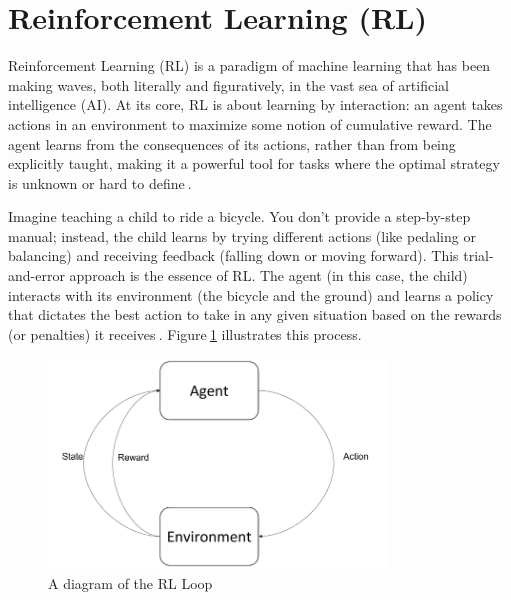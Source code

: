 \section{Reinforcement Learning (RL)}\label{RL_background}

Reinforcement Learning (RL) is a paradigm of machine learning that has been making waves, both literally and figuratively, in the vast sea of artificial intelligence (AI). At its core, RL is about learning by interaction: an agent takes actions in an environment to maximize some notion of cumulative reward. The agent learns from the consequences of its actions, rather than from being explicitly taught, making it a powerful tool for tasks where the optimal strategy is unknown or hard to define$~$\cite{sutton2018reinforcement}.

Imagine teaching a child to ride a bicycle. You don't provide a step-by-step manual; instead, the child learns by trying different actions (like pedaling or balancing) and receiving feedback (falling down or moving forward). This trial-and-error approach is the essence of RL. The agent (in this case, the child) interacts with its environment (the bicycle and the ground) and learns a policy that dictates the best action to take in any given situation based on the rewards (or penalties) it receives$~$\cite{watkins1992qlearning}. Figure$~$\ref{fig:rl_diagram} illustrates this process.

\begin{figure}
    \centering
    \includegraphics[width=0.8\textwidth]{Images/RL_Loop.png}
    \caption{A diagram of the RL Loop}
    \label{fig:rl_diagram}
\end{figure}

